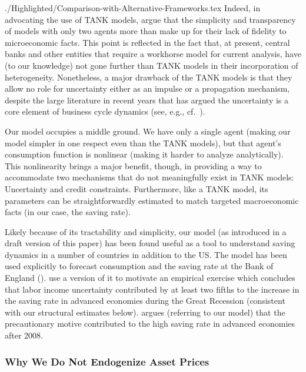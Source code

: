 \documentclass[titlepage]{\econtex}
\begin{document}
\begin{verbatimwrite}{./Highlighted/Comparison-with-Alternative-Frameworks.tex}
Indeed, in advocating the use of TANK models, \cite{dgTANK} argue that the simplicity and transparency of models with only two agents more than make up for their lack of fidelity to microeconomic facts.  This point is reflected in the fact that, at present, central banks and other entities that require a workhorse model for current analysis, have (to our knowledge) not gone further than TANK models in their incorporation of heterogeneity. Nonetheless, a major drawback of the TANK models is that they allow no role for uncertainty either as an impulse or a propagation mechanism, despite the large literature in recent years that has argued the uncertainty is a core element of business cycle dynamics (see, e.g., cf.\ \cite{bfjstUncertain}).

Our  model occupies a middle ground. We have only a single agent (making our model simpler in one respect even than the TANK models), but that agent's consumption function is nonlinear (making it harder to analyze analytically).  This nonlinearity brings a major benefit, though, in providing a way to accommodate two mechanisms that do not meaningfully exist in TANK models: Uncertainty and credit constraints.  Furthermore, like a TANK model, its parameters can be straightforwardly estimated to match targeted macroeconomic facts (in our case, the saving rate).

\hypertarget{Our-Model-Has-Been-Used-In-Other-Countries}{}
Likely because of its tractability and simplicity, our model (as introduced in a draft version of this paper) has been found useful as a tool to understand saving dynamics in a number of countries in addition to the US. The model has been used explicitly to forecast consumption and the saving rate at the Bank of England (\cite{BoE_forecasting}).  \cite{modyEtAl_precSaving} use a version of it to motivate an empirical exercise which concludes that labor income uncertainty contributed by at least two fifths to the increase in the saving rate in advanced economies during the Great Recession (consistent with our structural estimates below). \cite{Trichet_JacksonHoleSpeech} argues (referring to our model) that the precautionary motive contributed to the high saving rate in advanced economies after 2008.

\hypertarget{Why-We-Do-Not-Endogenize-Asset-Prices}{}

\subsubsection{Why We Do Not Endogenize Asset Prices}{}


\end{verbatimwrite}
\end{document}
